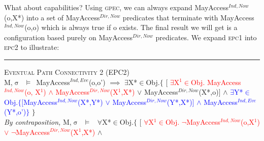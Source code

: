 \documentclass[a4paper,11pt, twoside,twocolumn]{article}
\newenvironment{logic}[1][]
{\begin{flushleft} \small }
{\end{flushleft}}
\newcommand{\loin}{$\in$}
\newcommand{\loforall}{$\forall$}
\newcommand{\loexists}{$\exists$}
\newcommand{\loand}{$\land$}
\newcommand{\loor} {$\lor$}
\newcommand{\loimplies}{$\implies$}
\newcommand{\losigma}{$\upsigma$}
\newcommand{\loturns} {$\vDash$}
\newcommand{\loneg}{$\boldsymbol \neg$}
\newcommand{\ablock} {\null\qquad}
\begin{document}
What about capabilities? Using \textsc{gpec}, we can always expand MayAccess$^{Ind, Now}$(o,X*) into a set of MayAccess$^{Dir, Now}$ predicates that terminate with MayAccess$^{Ind, Now}$(o,o) which is always true if o exists. The final result we will get is a configuration based purely on MayAccess$^{Dir, Now}$ predicates. We expand \textsc{epc1} into \textsc{epc2} to illustrate:

\begin{logic}
\hrule\null
\textsc{\normalsize *Eventual Path Connectivity 2 (EPC2)}\\
M,\losigma\ \loturns\ MayAccess$^{Ind,Eve}$(o,o')\linebreak
\ablock \loimplies\linebreak
\ablock \loexists X*\loin Obj.$\{$\linebreak
\ablock \ablock $[$\null
\textcolor{red}{\loexists X$^1$\loin{Obj}. MayAccess$^{Ind,Now}$(o, X$^1$) \loand\linebreak
\ablock \ablock \ablock \ablock \quad MayAccess$^{Dir,Now}$(X$^1$,X*)\linebreak
}
\ablock \ablock \quad \loor \linebreak
\ablock \ablock MayAccess$^{Dir,Now}$(X*,o)$ ]$\linebreak
\ablock \ablock \loand \linebreak
\textcolor{blue}{
\ablock \ablock \loexists Y*\loin Obj.$\{[$MayAccess$^{Ind,Now}$(X*,Y*)\linebreak
\ablock \ablock \ablock \ablock \quad \quad \loor \linebreak
\ablock \ablock \ablock \ablock \quad MayAccess$^{Dir,Now}$(Y*,X*)$]$\linebreak
\ablock \ablock \ablock \ablock \quad \loand \linebreak
\ablock \ablock \ablock \ablock \quad MayAccess$^{Ind,Eve}$(Y*,o')$\}$
}\linebreak
\ablock \ablock $\}$
\linebreak \\
\textit{By contraposition,}\linebreak
M,\losigma\ \loturns\ \linebreak
\ablock \loforall X*\loin Obj.$\{$\linebreak
\ablock \quad $[$\null
\textcolor{red}{\loforall X$^1$\loin{Obj}. \loneg MayAccess$^{Ind,Now}$(o,X$^1$) \loor\linebreak
\ablock \ablock \ablock \ablock \loneg MayAccess$^{Dir,Now}$(X$^1$,X*)\linebreak
}
\ablock \ablock \quad \loand \linebreak

\end{logic}
\end{document}

